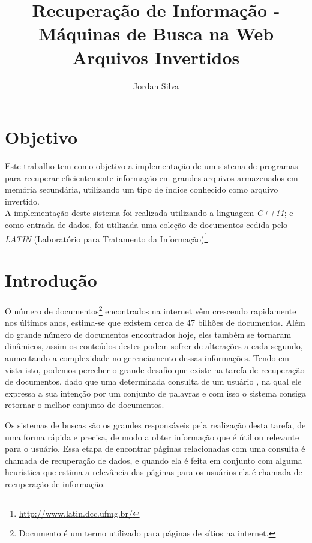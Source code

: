 \documentclass[12pt]{article}
\title{Recuperação de Informação - Máquinas de Busca na Web\\ Arquivos Invertidos}
\author{Jordan Silva\inst{1} }
\begin{document}
 

\maketitle


\section{Objetivo} \label{sec:goal}

Este trabalho tem como objetivo a implementação de um sistema de programas para recuperar eficientemente informação em grandes arquivos armazenados em memória secundária, utilizando um tipo de índice conhecido como arquivo invertido.
\\
\indent A implementação deste sistema foi realizada utilizando a linguagem \textit{C++11}; e como entrada de dados, foi utilizada uma coleção de documentos cedida pelo \textit{LATIN} (Laboratório para Tratamento da Informação)\footnote{\url{http://www.latin.dcc.ufmg.br/}}.

\section{Introdução} \label{sec:intro}

O número de documentos\footnote{Documento é um termo utilizado para páginas de sítios na internet.} encontrados na internet vêm crescendo rapidamente nos últimos anos, estima-se que existem cerca de 47 bilhões de documentos. Além do grande número de documentos encontrados hoje, eles também se tornaram dinâmicos, assim os conteúdos destes podem sofrer de alterações a cada segundo, aumentando a complexidade no gerenciamento dessas informações.
Tendo em vista isto, podemos perceber o grande desafio que existe na tarefa de recuperação de documentos, dado que uma determinada consulta  de um usuário , na qual ele expressa a sua intenção por um conjunto de palavras  e com isso o sistema consiga retornar o melhor conjunto de documentos.

Os sistemas de buscas são os grandes responsáveis pela realização desta tarefa, de uma forma rápida e precisa, de modo a obter informação que é útil ou relevante para o usuário. Essa etapa de encontrar páginas relacionadas com uma consulta é chamada de recuperação de dados, e quando ela é feita em conjunto com alguma heurística que estima a relevância das páginas para os usuários ela é chamada de recuperação de informação. \cite{Baeza-Yates:1999:MIR:553876}
\end{document}
